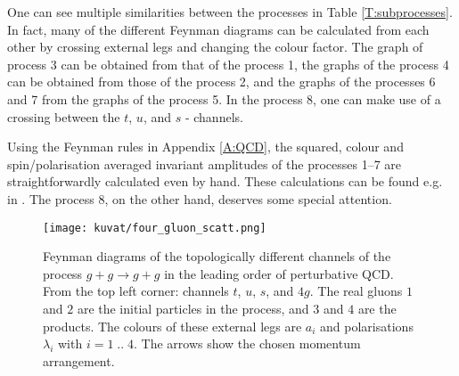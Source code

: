 \documentclass[a4paper, twoside, english, 12pt]{report}
\begin{document}
One can see multiple similarities between the processes in Table \ref{T:subprocesses}. In fact, many of the different Feynman diagrams can be calculated from each other by crossing external legs and changing the colour factor. The graph of process 3 can be obtained from that of the process 1, the graphs of the process 4 can be obtained from those of the process 2, and the graphs of the processes 6 and 7 from the graphs of the process 5. In the process 8, one can make use of a crossing between the $t$, $u$, and $s$ - channels.

Using the Feynman rules in Appendix \ref{A:QCD}, the squared, colour and spin/polarisation averaged invariant amplitudes of the processes 1--7 are straightforwardly calculated even by hand. These calculations can be found e.g. in \cite{pqcd}. The process 8, on the other hand, deserves some special attention. 

\begin{figure}[h]
	\centering
	\texttt{[image: kuvat/four\_gluon\_scatt.png]}
	\caption{Feynman diagrams of the topologically different channels of the process $g+g\rightarrow g+g$ in the leading order of perturbative QCD. From the top left corner: channels $t$, $u$, $s$, and $4g$. The real gluons $1$ and $2$ are the initial particles in the process, and $3$ and $4$ are the products. The colours of these external legs are $a_i$ and polarisations $\lambda_i$ with $i=1\;..\;4$. The arrows show the chosen momentum arrangement.}
	\label{F:four_gluon_scatt}
\end{figure} 
\end{document}
